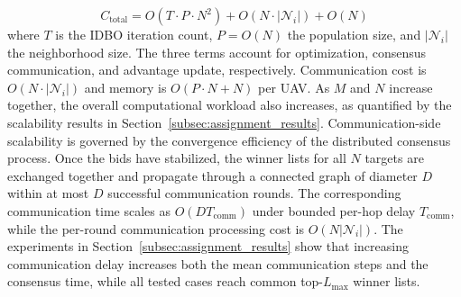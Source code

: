 \documentclass[lettersize,journal]{IEEEtran}
\newcommand{\hladd}[1]{{\color{blue}#1}}
\begin{document}
\begin{equation}
\label{eq:complexity}
C_{\text{total}} = O(T \cdot P \cdot N^2) + O(N \cdot |\mathcal{N}_i|) + O(N)
\end{equation}
where $T$ is the IDBO iteration count, $P = O(N)$ the population size, and $|\mathcal{N}_i|$ the neighborhood size. The three terms account for optimization, consensus communication, and advantage update, respectively. Communication cost is $O(N \cdot |\mathcal{N}_i|)$ and memory is $O(P \cdot N + N)$ per UAV. 
\hladd{As $M$ and $N$ increase together, the overall computational workload
also increases, as quantified by the scalability results in
Section~\ref{subsec:assignment_results}. Communication-side scalability is
governed by the convergence efficiency of the distributed consensus process.
Once the bids have stabilized, the winner lists for all $N$ targets are
exchanged together and propagate through a connected graph of diameter $D$
within at most $D$ successful communication rounds. The corresponding
communication time scales as $O(DT_{\mathrm{comm}})$ under bounded per-hop
delay $T_{\mathrm{comm}}$, while the per-round communication processing cost
is $O(N|\mathcal{N}_i|)$. The experiments in
Section~\ref{subsec:assignment_results} show that increasing communication
delay increases both the mean communication steps and the consensus time,
while all tested cases reach common top-$L_{\max}$ winner lists.}
\end{document}
